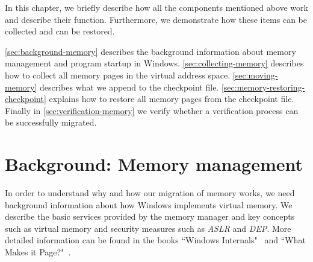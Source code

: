 \documentclass[a4paper, 11pt, english]{report}
\begin{document}
In this chapter, we briefly describe how all the components mentioned above work and describe their function. Furthermore, we demonstrate how these items can be collected and can be restored.

\autoref{sec:background-memory} describes the background information about memory management and program startup in Windows. \autoref{sec:collecting-memory} describes how to collect all memory pages in the virtual address space. \autoref{sec:moving-memory} describes what we append to the checkpoint file. \autoref{sec:memory-restoring-checkpoint} explains how to restore all memory pages from the checkpoint file. Finally in \autoref{sec:verification-memory} we verify whether a verification process can be successfully migrated.


\section{Background: Memory management}
\label{sec:background-memory}
In order to understand why and how our migration of memory works, we need background information about how Windows implements virtual memory. We describe the basic services provided by the memory manager and key concepts such as virtual memory and security measures such as \textit{ASLR} and \textit{DEP}. More detailed information can be found in the books ``Windows Internals"~\cite{windows-internals} and ``What Makes it Page?"~\cite{what-makes-it-page}.

%
\end{document}
